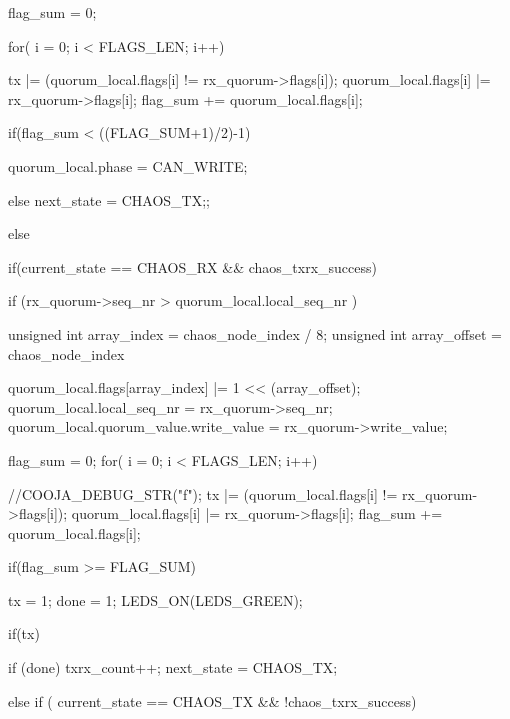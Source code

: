 {{{{            flag_sum = 0;
            
            for( i = 0; i < FLAGS_LEN; i++){
            tx |= (quorum_local.flags[i] != rx_quorum->flags[i]);
            quorum_local.flags[i] |= rx_quorum->flags[i];
            flag_sum += quorum_local.flags[i];
         
                    }
            if(flag_sum < ((FLAG_SUM+1)/2)-1){
            
             quorum_local.phase = CAN_WRITE;
            
              }   
            
            }
            
            } 
            else {
            next_state = CHAOS_TX;;
        }
            
            
        
    }
    
    else {
    
    
        if(current_state == CHAOS_RX && chaos_txrx_success){
        
        if (rx_quorum->seq_nr > quorum_local.local_seq_nr ){

        unsigned int array_index = chaos_node_index / 8;
        unsigned int array_offset = chaos_node_index %

        quorum_local.flags[array_index] |= 1 << (array_offset);
        quorum_local.local_seq_nr = rx_quorum->seq_nr;
        quorum_local.quorum_value.write_value = rx_quorum->write_value;

          }
          flag_sum = 0;
         for( i = 0; i < FLAGS_LEN; i++){
            //COOJA_DEBUG_STR("f");
            tx |= (quorum_local.flags[i] != rx_quorum->flags[i]);
            quorum_local.flags[i] |= rx_quorum->flags[i];
            flag_sum += quorum_local.flags[i];
         

         }
         
         
         if(flag_sum >= FLAG_SUM){
         
         tx = 1;
         done = 1;
         LEDS_ON(LEDS_GREEN);
         
         }
         
         if(tx){
         if (done){
         txrx_count++;
         }
         next_state = CHAOS_TX;

         }
                
        
        }
        
        else if ( current_state == CHAOS_TX && !chaos_txrx_success){
       
}}}
